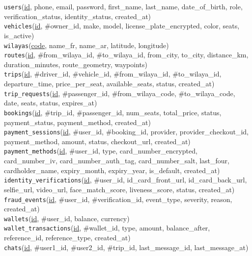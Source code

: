 \documentclass[12pt, a4paper, oneside]{report}
\begin{document}
\begin{highlight}[breakable=false]
\singlespacing\footnotesize
\texttt{users}(\underline{id}, phone, email, password, first\_name, last\_name, date\_of\_birth, role, verification\_status, identity\_status, created\_at)\\[1pt]
\texttt{vehicles}(\underline{id}, \#owner\_id, make, model, license\_plate\_encrypted, color, seats, is\_active)\\[1pt]
\texttt{wilayas}(\underline{code}, name\_fr, name\_ar, latitude, longitude)\\[1pt]
\texttt{routes}(\underline{id}, \#from\_wilaya\_id, \#to\_wilaya\_id, from\_city, to\_city, distance\_km, duration\_minutes, route\_geometry, waypoints)\\[1pt]
\texttt{trips}(\underline{id}, \#driver\_id, \#vehicle\_id, \#from\_wilaya\_id, \#to\_wilaya\_id, departure\_time, price\_per\_seat, available\_seats, status, created\_at)\\[1pt]
\texttt{trip\_requests}(\underline{id}, \#passenger\_id, \#from\_wilaya\_code, \#to\_wilaya\_code, date, seats, status, expires\_at)\\[1pt]
\texttt{bookings}(\underline{id}, \#trip\_id, \#passenger\_id, num\_seats, total\_price, status, payment\_status, payment\_method, created\_at)\\[1pt]
\texttt{payment\_sessions}(\underline{id}, \#user\_id, \#booking\_id, provider, provider\_checkout\_id, payment\_method, amount, status, checkout\_url, created\_at)\\[1pt]
\texttt{payment\_methods}(\underline{id}, \#user\_id, type, card\_number\_encrypted, card\_number\_iv, card\_number\_auth\_tag, card\_number\_salt, last\_four, cardholder\_name, expiry\_month, expiry\_year, is\_default, created\_at)\\[1pt]
\texttt{identity\_verifications}(\underline{id}, \#user\_id, id\_card\_front\_url, id\_card\_back\_url, selfie\_url, video\_url, face\_match\_score, liveness\_score, status, created\_at)\\[1pt]
\texttt{fraud\_events}(\underline{id}, \#user\_id, \#verification\_id, event\_type, severity, reason, created\_at)\\[1pt]
\texttt{wallets}(\underline{id}, \#user\_id, balance, currency)\\[1pt]
\texttt{wallet\_transactions}(\underline{id}, \#wallet\_id, type, amount, balance\_after, reference\_id, reference\_type, created\_at)\\[1pt]
\texttt{chats}(\underline{id}, \#user1\_id, \#user2\_id, \#trip\_id, last\_message\_id, last\_message\_at)\\[1pt]

\end{highlight}
\end{document}
